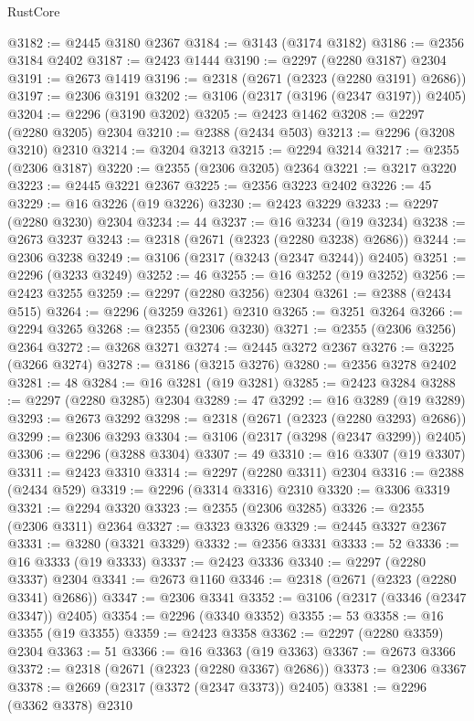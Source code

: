 \begin{lexlean}{RustCore}
\begin{coremodule}
@3182 := @2445 @3180 @2367
@3184 := @3143 (@3174 @3182)
@3186 := @2356 @3184 @2402
@3187 := @2423 @1444
@3190 := @2297 (@2280 @3187) @2304
@3191 := @2673 @1419
@3196 := @2318 (@2671 (@2323 (@2280 @3191) @2686))
@3197 := @2306 @3191
@3202 := @3106 (@2317 (@3196 (@2347 @3197)) @2405)
@3204 := @2296 (@3190 @3202)
@3205 := @2423 @1462
@3208 := @2297 (@2280 @3205) @2304
@3210 := @2388 (@2434 @503)
@3213 := @2296 (@3208 @3210) @2310
@3214 := @3204 @3213
@3215 := @2294 @3214
@3217 := @2355 (@2306 @3187)
@3220 := @2355 (@2306 @3205) @2364
@3221 := @3217 @3220
@3223 := @2445 @3221 @2367
@3225 := @2356 @3223 @2402
@3226 := 45
@3229 := @16 @3226 (@19 @3226)
@3230 := @2423 @3229
@3233 := @2297 (@2280 @3230) @2304
@3234 := 44
@3237 := @16 @3234 (@19 @3234)
@3238 := @2673 @3237
@3243 := @2318 (@2671 (@2323 (@2280 @3238) @2686))
@3244 := @2306 @3238
@3249 := @3106 (@2317 (@3243 (@2347 @3244)) @2405)
@3251 := @2296 (@3233 @3249)
@3252 := 46
@3255 := @16 @3252 (@19 @3252)
@3256 := @2423 @3255
@3259 := @2297 (@2280 @3256) @2304
@3261 := @2388 (@2434 @515)
@3264 := @2296 (@3259 @3261) @2310
@3265 := @3251 @3264
@3266 := @2294 @3265
@3268 := @2355 (@2306 @3230)
@3271 := @2355 (@2306 @3256) @2364
@3272 := @3268 @3271
@3274 := @2445 @3272 @2367
@3276 := @3225 (@3266 @3274)
@3278 := @3186 (@3215 @3276)
@3280 := @2356 @3278 @2402
@3281 := 48
@3284 := @16 @3281 (@19 @3281)
@3285 := @2423 @3284
@3288 := @2297 (@2280 @3285) @2304
@3289 := 47
@3292 := @16 @3289 (@19 @3289)
@3293 := @2673 @3292
@3298 := @2318 (@2671 (@2323 (@2280 @3293) @2686))
@3299 := @2306 @3293
@3304 := @3106 (@2317 (@3298 (@2347 @3299)) @2405)
@3306 := @2296 (@3288 @3304)
@3307 := 49
@3310 := @16 @3307 (@19 @3307)
@3311 := @2423 @3310
@3314 := @2297 (@2280 @3311) @2304
@3316 := @2388 (@2434 @529)
@3319 := @2296 (@3314 @3316) @2310
@3320 := @3306 @3319
@3321 := @2294 @3320
@3323 := @2355 (@2306 @3285)
@3326 := @2355 (@2306 @3311) @2364
@3327 := @3323 @3326
@3329 := @2445 @3327 @2367
@3331 := @3280 (@3321 @3329)
@3332 := @2356 @3331
@3333 := 52
@3336 := @16 @3333 (@19 @3333)
@3337 := @2423 @3336
@3340 := @2297 (@2280 @3337) @2304
@3341 := @2673 @1160
@3346 := @2318 (@2671 (@2323 (@2280 @3341) @2686))
@3347 := @2306 @3341
@3352 := @3106 (@2317 (@3346 (@2347 @3347)) @2405)
@3354 := @2296 (@3340 @3352)
@3355 := 53
@3358 := @16 @3355 (@19 @3355)
@3359 := @2423 @3358
@3362 := @2297 (@2280 @3359) @2304
@3363 := 51
@3366 := @16 @3363 (@19 @3363)
@3367 := @2673 @3366
@3372 := @2318 (@2671 (@2323 (@2280 @3367) @2686))
@3373 := @2306 @3367
@3378 := @2669 (@2317 (@3372 (@2347 @3373)) @2405)
@3381 := @2296 (@3362 @3378) @2310

\end{coremodule}
\end{lexlean}
